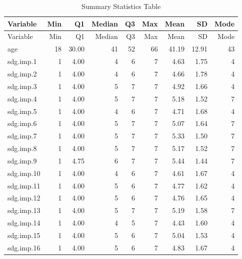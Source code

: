 \documentclass[
]{article}
\begin{document}
\begin{longtable}[]{@{}lrrrrrrrr@{}}
\caption{Summary Statistics Table}\tabularnewline
\toprule\noalign{}
Variable & Min & Q1 & Median & Q3 & Max & Mean & SD & Mode \\
\midrule\noalign{}
\endfirsthead
\toprule\noalign{}
Variable & Min & Q1 & Median & Q3 & Max & Mean & SD & Mode \\
\midrule\noalign{}
\endhead
\bottomrule\noalign{}
\endlastfoot
age & 18 & 30.00 & 41 & 52 & 66 & 41.19 & 12.91 & 43 \\
sdg.imp.1 & 1 & 4.00 & 4 & 6 & 7 & 4.63 & 1.75 & 4 \\
sdg.imp.2 & 1 & 4.00 & 4 & 6 & 7 & 4.66 & 1.78 & 4 \\
sdg.imp.3 & 1 & 4.00 & 5 & 7 & 7 & 4.92 & 1.66 & 4 \\
sdg.imp.4 & 1 & 4.00 & 5 & 7 & 7 & 5.18 & 1.52 & 7 \\
sdg.imp.5 & 1 & 4.00 & 4 & 6 & 7 & 4.71 & 1.68 & 4 \\
sdg.imp.6 & 1 & 4.00 & 5 & 7 & 7 & 5.07 & 1.64 & 7 \\
sdg.imp.7 & 1 & 4.00 & 5 & 7 & 7 & 5.33 & 1.50 & 7 \\
sdg.imp.8 & 1 & 4.00 & 5 & 7 & 7 & 5.17 & 1.52 & 7 \\
sdg.imp.9 & 1 & 4.75 & 6 & 7 & 7 & 5.44 & 1.44 & 7 \\
sdg.imp.10 & 1 & 4.00 & 4 & 6 & 7 & 4.61 & 1.67 & 4 \\
sdg.imp.11 & 1 & 4.00 & 5 & 6 & 7 & 4.77 & 1.62 & 4 \\
sdg.imp.12 & 1 & 4.00 & 5 & 6 & 7 & 4.76 & 1.65 & 4 \\
sdg.imp.13 & 1 & 4.00 & 5 & 7 & 7 & 5.19 & 1.58 & 7 \\
sdg.imp.14 & 1 & 4.00 & 4 & 5 & 7 & 4.43 & 1.60 & 4 \\
sdg.imp.15 & 1 & 4.00 & 5 & 6 & 7 & 5.04 & 1.53 & 4 \\
sdg.imp.16 & 1 & 4.00 & 5 & 6 & 7 & 4.83 & 1.67 & 4 \\
\end{longtable}
\end{document}
